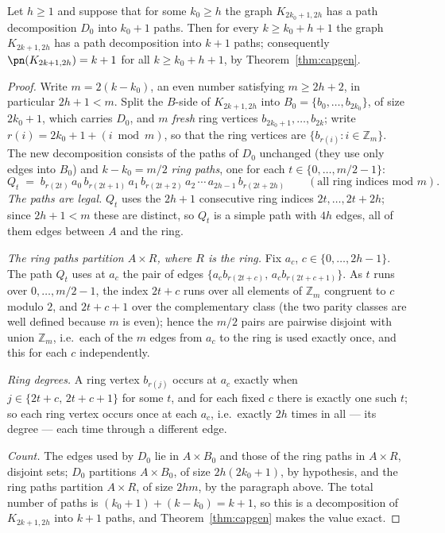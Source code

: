 \begin{theorem}\label{thm:ringclosure}
Let $h\ge1$ and suppose that for some $k_0\ge h$ the graph $K_{2k_0+1,2h}$ has a path
decomposition $D_0$ into $k_0+1$ paths. Then for every $k\ge k_0+h+1$ the graph $K_{2k+1,2h}$
has a path decomposition into $k+1$ paths; consequently $\pn(K_{2k+1,2h})=k+1$ for all
$k\ge k_0+h+1$, by Theorem~\ref{thm:capgen}.
\end{theorem}

\begin{proof}
Write $m=2(k-k_0)$, an even number satisfying $m\ge2h+2$, in particular $2h+1<m$. Split the
$B$-side of $K_{2k+1,2h}$ into $B_0=\{b_0,\dots,b_{2k_0}\}$, of size $2k_0+1$, which carries
$D_0$, and $m$ \emph{fresh} ring vertices $b_{2k_0+1},\dots,b_{2k}$; write
$r(i)=2k_0+1+(i\bmod m)$, so that the ring vertices are
$\{b_{r(i)} : i\in\mathbb{Z}_m\}$. The new decomposition consists of the paths of $D_0$
unchanged (they use only edges into $B_0$) and $k-k_0=m/2$ \emph{ring paths}, one for each
$t\in\{0,\dots,m/2-1\}$:
\[
Q_t\;=\;b_{r(2t)}\,a_0\,b_{r(2t+1)}\,a_1\,b_{r(2t+2)}\,a_2\,\cdots\,a_{2h-1}\,b_{r(2t+2h)}
\qquad(\text{all ring indices mod } m).
\]
\emph{The paths are legal.} $Q_t$ uses the $2h+1$ consecutive ring indices
$2t,\dots,2t+2h$; since $2h+1<m$ these are distinct, so $Q_t$ is a simple path with $4h$ edges,
all of them edges between $A$ and the ring.

\emph{The ring paths partition $A\times R$, where $R$ is the ring.} Fix $a_c$,
$c\in\{0,\dots,2h-1\}$. The path $Q_t$ uses at $a_c$ the pair of edges
$\{a_cb_{r(2t+c)},\,a_cb_{r(2t+c+1)}\}$. As $t$ runs over $0,\dots,m/2-1$, the index $2t+c$
runs over all elements of $\mathbb{Z}_m$ congruent to $c$ modulo $2$, and $2t+c+1$ over the
complementary class (the two parity classes are well defined because $m$ is even); hence the
$m/2$ pairs are pairwise disjoint with union $\mathbb{Z}_m$, i.e.\ each of the $m$ edges from
$a_c$ to the ring is used exactly once, and this for each $c$ independently.

\emph{Ring degrees.} A ring vertex $b_{r(j)}$ occurs at $a_c$ exactly when
$j\in\{2t+c,\,2t+c+1\}$ for some $t$, and for each fixed $c$ there is exactly one such $t$; so
each ring vertex occurs once at each $a_c$, i.e.\ exactly $2h$ times in all --- its degree ---
each time through a different edge.

\emph{Count.} The edges used by $D_0$ lie in $A\times B_0$ and those of the ring paths in
$A\times R$, disjoint sets; $D_0$ partitions $A\times B_0$, of size $2h(2k_0+1)$, by
hypothesis, and the ring paths partition $A\times R$, of size $2hm$, by the paragraph above.
The total number of paths is $(k_0+1)+(k-k_0)=k+1$, so this is a decomposition of
$K_{2k+1,2h}$ into $k+1$ paths, and Theorem~\ref{thm:capgen} makes the value exact.
\end{proof}

